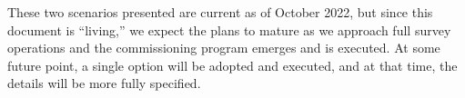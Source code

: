 These two scenarios presented are current as of October 2022, but since this document is ``living,'' we expect the plans to mature as we approach full survey operations and the commissioning program emerges and is executed.
At some future point, a single option will be adopted and executed, and at that time, the details will be more fully specified.
